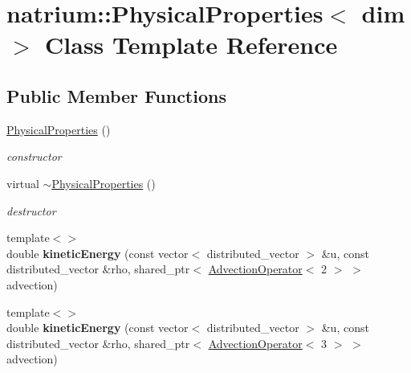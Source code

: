 \hypertarget{classnatrium_1_1PhysicalProperties}{
\section{natrium::PhysicalProperties$<$ dim $>$ Class Template Reference}
\label{classnatrium_1_1PhysicalProperties}
}
\subsection*{Public Member Functions}
\begin{DoxyCompactItemize}
\item 
\hypertarget{classnatrium_1_1PhysicalProperties_a5047491de09441e2aae00f6ba838f99e}{
\hyperlink{classnatrium_1_1PhysicalProperties_a5047491de09441e2aae00f6ba838f99e}{PhysicalProperties} ()}
\label{classnatrium_1_1PhysicalProperties_a5047491de09441e2aae00f6ba838f99e}

\begin{DoxyCompactList}\small\item\em constructor \item\end{DoxyCompactList}\item 
\hypertarget{classnatrium_1_1PhysicalProperties_a1089bbb66f56e8c31cdb2908d5b08757}{
virtual \hyperlink{classnatrium_1_1PhysicalProperties_a1089bbb66f56e8c31cdb2908d5b08757}{$\sim$PhysicalProperties} ()}
\label{classnatrium_1_1PhysicalProperties_a1089bbb66f56e8c31cdb2908d5b08757}

\begin{DoxyCompactList}\small\item\em destructor \item\end{DoxyCompactList}\item 
\hypertarget{classnatrium_1_1PhysicalProperties_a1a76b0dd1a88cfc037b85771c3166af7}{
{\footnotesize template$<$$>$ }\\double {\bfseries kineticEnergy} (const vector$<$ distributed\_\-vector $>$ \&u, const distributed\_\-vector \&rho, shared\_\-ptr$<$ \hyperlink{classnatrium_1_1AdvectionOperator}{AdvectionOperator}$<$ 2 $>$ $>$ advection)}
\label{classnatrium_1_1PhysicalProperties_a1a76b0dd1a88cfc037b85771c3166af7}

\item 
\hypertarget{classnatrium_1_1PhysicalProperties_abeda6e133c618f7eec4ccbeb08ef452e}{
{\footnotesize template$<$$>$ }\\double {\bfseries kineticEnergy} (const vector$<$ distributed\_\-vector $>$ \&u, const distributed\_\-vector \&rho, shared\_\-ptr$<$ \hyperlink{classnatrium_1_1AdvectionOperator}{AdvectionOperator}$<$ 3 $>$ $>$ advection)}
\label{classnatrium_1_1PhysicalProperties_abeda6e133c618f7eec4ccbeb08ef452e}

\end{DoxyCompactItemize}
